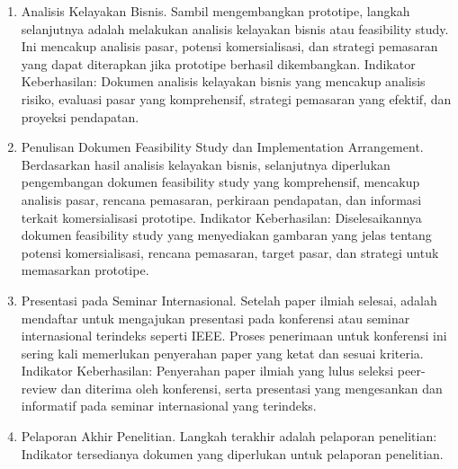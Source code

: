 \begin{enumerate}
    \item Analisis Kelayakan Bisnis. Sambil mengembangkan prototipe, langkah selanjutnya adalah melakukan analisis kelayakan bisnis atau feasibility study. Ini mencakup analisis pasar, potensi komersialisasi, dan strategi pemasaran yang dapat diterapkan jika prototipe berhasil dikembangkan. Indikator Keberhasilan: Dokumen analisis kelayakan bisnis yang mencakup analisis risiko, evaluasi pasar yang komprehensif, strategi pemasaran yang efektif, dan proyeksi pendapatan.
    \item Penulisan Dokumen Feasibility Study dan Implementation Arrangement. Berdasarkan hasil analisis kelayakan bisnis, selanjutnya diperlukan pengembangan dokumen feasibility study yang komprehensif, mencakup analisis pasar, rencana pemasaran, perkiraan pendapatan, dan informasi terkait komersialisasi prototipe. Indikator Keberhasilan: Diselesaikannya dokumen feasibility study yang menyediakan gambaran yang jelas tentang potensi komersialisasi, rencana pemasaran, target pasar, dan strategi untuk memasarkan prototipe.
    \item Presentasi pada Seminar Internasional. Setelah paper ilmiah selesai, adalah mendaftar untuk mengajukan presentasi pada konferensi atau seminar internasional terindeks seperti IEEE. Proses penerimaan untuk konferensi ini sering kali memerlukan penyerahan paper yang ketat dan sesuai kriteria. Indikator Keberhasilan: Penyerahan paper ilmiah yang lulus seleksi peer-review dan diterima oleh konferensi, serta presentasi yang mengesankan dan informatif pada seminar internasional yang terindeks.
    \item Pelaporan Akhir Penelitian. Langkah terakhir adalah pelaporan penelitian: Indikator tersedianya dokumen yang diperlukan untuk pelaporan penelitian.
\end{enumerate}

